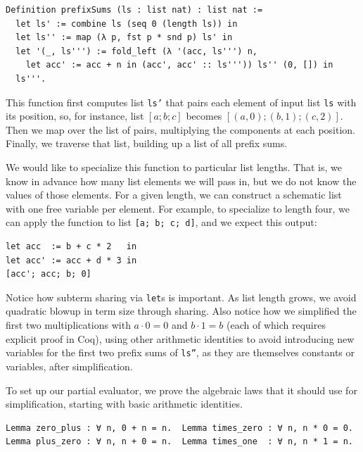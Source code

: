 \begin{verbatim}
Definition prefixSums (ls : list nat) : list nat :=
  let ls' := combine ls (seq 0 (length ls)) in
  let ls'' := map (λ p, fst p * snd p) ls' in
  let '(_, ls''') := fold_left (λ '(acc, ls''') n,
    let acc' := acc + n in (acc', acc' :: ls''')) ls'' (0, []) in
  ls'''.
\end{verbatim}

This function first computes list \texttt{ls'} that pairs each element of input list \texttt{ls} with its position, so, for instance, list $[a; b; c]$ becomes $[(a, 0); (b, 1); (c, 2)]$.
Then we map over the list of pairs, multiplying the components at each position.
Finally, we traverse that list, building up a list of all prefix sums.

We would like to specialize this function to particular list lengths.
That is, we know in advance how many list elements we will pass in, but we do not know the values of those elements.
For a given length, we can construct a schematic list with one free variable per element.
For example, to specialize to length four, we can apply the function to list \texttt{[a; b; c; d]}, and we expect this output:
\begin{verbatim}
let acc  := b + c * 2   in
let acc' := acc + d * 3 in
[acc'; acc; b; 0]
\end{verbatim}

Notice how subterm sharing via \texttt{let}s is important.
As list length grows, we avoid quadratic blowup in term size through sharing.
Also notice how we simplified the first two multiplications with $a \cdot 0 = 0$ and $b \cdot 1 = b$ (each of which requires explicit proof in Coq), using other arithmetic identities to avoid introducing new variables for the first two prefix sums of \texttt{ls''}, as they are themselves constants or variables, after simplification.

To set up our partial evaluator, we prove the algebraic laws that it should use for simplification, starting with basic arithmetic identities.
\begin{verbatim}
Lemma zero_plus : ∀ n, 0 + n = n.  Lemma times_zero : ∀ n, n * 0 = 0.
Lemma plus_zero : ∀ n, n + 0 = n.  Lemma times_one  : ∀ n, n * 1 = n.
\end{verbatim}

